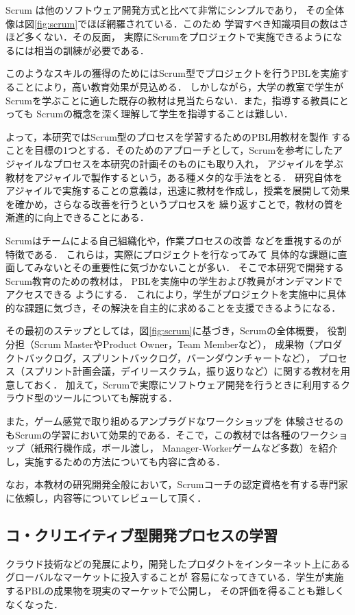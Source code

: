 \documentclass[a4j,9pt,twocolumn,twoside]{jsarticle}
\begin{document}
	Scrum は他のソフトウェア開発方式と比べて非常にシンプルであり，
	その全体像は図\ref{fig:scrum}でほぼ網羅されている．このため
	学習すべき知識項目の数はさほど多くない．その反面，
	実際にScrumをプロジェクトで実施できるようになるには相当の訓練が必要である．

	このようなスキルの獲得のためにはScrum型でプロジェクトを行うPBLを実施することにより，高い教育効果が見込める．
	しかしながら，大学の教室で学生がScrumを学ぶことに適した既存の教材は見当たらない．また，指導する教員にとっても
	Scrumの概念を深く理解して学生を指導することは難しい．

	よって，本研究ではScrum型のプロセスを学習するためのPBL用教材を製作
	することを目標の1つとする．そのためのアプローチとして，Scrumを参考にしたアジャイルなプロセスを本研究の計画そのものにも取り入れ，
	アジャイルを学ぶ教材をアジャイルで製作するという，ある種メタ的な手法をとる．
	研究自体をアジャイルで実施することの意義は，迅速に教材を作成し，授業を展開して効果を確かめ，さらなる改善を行うというプロセスを
	繰り返すことで，教材の質を漸進的に向上できることにある．
	
	Scrumはチームによる自己組織化や，作業プロセスの改善
	などを重視するのが特徴である．
	これらは，実際にプロジェクトを行なってみて
	具体的な課題に直面してみないとその重要性に気づかないことが多い．
	そこで本研究で開発するScrum教育のための教材は，
	PBLを実施中の学生および教員がオンデマンドでアクセスできる
	ようにする．
	これにより，学生がプロジェクトを実施中に具体的な課題に気づき，その解決を自主的に求めることを支援できるようになる．
	
	その最初のステップとしては，図\ref{fig:scrum}に基づき，Scrumの全体概要，
	役割分担（Scrum MasterやProduct Owner，Team Memberなど），
	成果物（プロダクトバックログ，スプリントバックログ，バーンダウンチャートなど），
	プロセス（スプリント計画会議，デイリースクラム，振り返りなど）に関する教材を用意しておく．
	加えて，Scrumで実際にソフトウェア開発を行うときに利用するクラウド型のツールについても解説する．

	また，ゲーム感覚で取り組めるアンプラグドなワークショップを
	体験させるのもScrumの学習において効果的である．そこで，この教材では各種のワークショップ（紙飛行機作成，ボール渡し，
	Manager-Workerゲームなど多数）を紹介し，実施するための方法についても内容に含める．

	なお，本教材の研究開発全般において，Scrumコーチの認定資格を有する専門家に依頼し，内容等についてレビューして頂く．

\subsection{コ・クリエイティブ型開発プロセスの学習}
	クラウド技術などの発展により，開発したプロダクトをインターネット上にあるグローバルなマーケットに投入することが
	容易になってきている．学生が実施するPBLの成果物を現実のマーケットで公開し，
	その評価を得ることも難しくなくなった．
	
\end{document}
